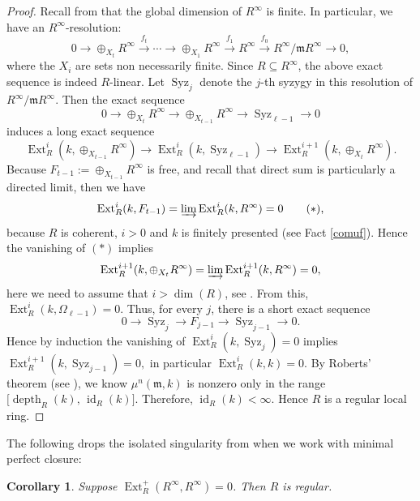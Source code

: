 \documentclass[11pt,a4paper]{amsart}
\numberwithin{equation}{section}
\newtheorem{corollary}[theorem]{Corollary}
\theoremstyle{definition}
\theoremstyle{remark}
\newcommand{\Syz}{\operatorname{Syz}}
\newcommand{\vil}{\operatornamewithlimits{\varinjlim}}
\begin{document}
\begin{proof}
Recall from \cite{BH} that the global dimension of \(R^\infty\) is finite.
In particular, we have an \(R^\infty\)-resolution:
\[
0 \longrightarrow \oplus_{X_t}  R^\infty   \stackrel{f_t}\longrightarrow \cdots \longrightarrow \oplus_{X_1} R^\infty  \stackrel{f_1}\longrightarrow R^\infty\stackrel{f_0} \longrightarrow R^\infty / \mathfrak m R^\infty \longrightarrow 0,
\]
where the \(X_i\) are sets non necessarily finite. Since \(R \subseteq R^\infty\), the above exact sequence is indeed \(R\)-linear.
Let $\Syz_j$ denote the $j$-th syzygy in this resolution of $R^\infty / \mathfrak m R^\infty$. Then the exact sequence
\[
0\longrightarrow \oplus_{X_t} R^\infty  
\longrightarrow \oplus_{X_{t-1}} R^\infty 
\longrightarrow \Syz_{\ell-1}
\longrightarrow 0
\]
induces a long exact sequence
\[
\operatorname{Ext}^{i}_{R}
(k,\oplus_{X_{t-1}} R^\infty)
\longrightarrow
\operatorname{Ext}^{i}_{R}(k,\Syz_{\ell-1})  \longrightarrow
\operatorname{Ext}^{i+1}_{R}
(k,\oplus_{X_t} R^\infty).
\]
Because $F_{t-1}:=\oplus_{X_{t-1}} R^\infty $ is free, and recall that direct sum is particularly a directed limit, then we have
\[
\operatorname{Ext}^{i}_{R}(k,F_{t-1})=\vil 	\operatorname{Ext}^{i}_{R}(k,R^\infty) =0
\qquad (\ast),
\] because 
 $R$  is coherent, $i>0$ and $k$
is  finitely presented (see {Fact} \ref{comuf}).
Hence the vanishing of $(\ast)$
implies
\[
\operatorname{Ext}^{i+1}_{R}
(k,\oplus_{X_t} R^\infty)=\vil	\operatorname{Ext}^{i+1}_{R}(k,R^\infty) =0,
\]here we need to assume that $i>\dim(R)$, see \cite[Theorem 1.2]{IYENGAR}.
From this,
\(
\operatorname{Ext}^{i}_{R}(k,\Omega_{\ell-1})=0 .
\)
Thus, for every $j$,
	there is a short exact sequence
	\[
	0\longrightarrow \Syz_{j}
	\longrightarrow F_{j-1}
	\longrightarrow \Syz_{j-1}
	\longrightarrow 0 .
	\]
	Hence by induction the vanishing of
	\(
	\operatorname{Ext}^{i}_{R}(k,\Syz_j)
	=0\)
	implies
	\(
	\operatorname{Ext}^{i+1}_{R}(k,\Syz_{j-1})=0 ,
	\)
	 in particular
	\(
	\operatorname{Ext}^{i}_{R}(k,k)=0 .
	\)
By Roberts' theorem (see \cite[Theorem 2]{Ro2}), we know $\mu^n(\mathfrak m,k)$ is nonzero only in the range
$
\bigl[\operatorname{depth}_R(k),\,\operatorname{id}_R(k)\bigr].	$ Therefore,
	\(
	\operatorname{id}_{R}(k)<\infty .
	\) Hence $R$ is a regular local ring.
\end{proof}

The following drops the isolated singularity from \cite[Theorem 3.15(4)]{Ryo} when we work with minimal perfect closure: 
\begin{corollary}\label{63}
Suppose 	\(
	\operatorname{Ext}^{+}_{R}(R^\infty,R^\infty)=0\).
Then 	$R$ is regular.
\end{corollary}
\end{document}
